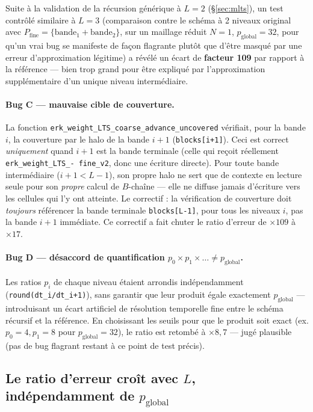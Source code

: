 \documentclass[11pt]{article}
\newcommand{\code}[1]{\texttt{#1}}
\begin{document}
Suite à la validation de la récursion générique à $L=2$ (\S\ref{sec:mlts}),
un test contrôlé similaire à $L=3$ (comparaison contre le schéma à 2
niveaux original avec $P_{\text{fine}}=\{\text{bande}_1+\text{bande}_2\}$,
sur un maillage réduit $N=1$, $p_{\text{global}}=32$, pour qu'un vrai bug
se manifeste de façon flagrante plutôt que d'être masqué par une erreur
d'approximation légitime) a révélé un écart de \textbf{facteur 109} par
rapport à la référence --- bien trop grand pour être expliqué par
l'approximation supplémentaire d'un unique niveau intermédiaire.

\paragraph{Bug C --- mauvaise cible de couverture.} La fonction
\code{erk\_weight\_LTS\_coarse\_advance\_uncovered} vérifiait, pour la
bande $i$, la couverture par le halo de la bande $i{+}1$
(\code{blocks[i+1]}). Ceci est correct \emph{uniquement} quand $i{+}1$ est
la bande terminale (celle qui reçoit réellement \code{erk\_weight\_LTS\_-
fine\_v2}, donc une écriture directe). Pour toute bande intermédiaire
($i+1 < L-1$), son propre halo ne sert que de contexte en lecture seule
pour son \emph{propre} calcul de $B$-chaîne --- elle ne diffuse jamais
d'écriture vers les cellules qui l'y ont atteinte. Le correctif : la
vérification de couverture doit \emph{toujours} référencer la bande
terminale \code{blocks[L-1]}, pour tous les niveaux $i$, pas la bande
$i{+}1$ immédiate. Ce correctif a fait chuter le ratio d'erreur de
$\times 109$ à $\times 17$.

\paragraph{Bug D --- désaccord de quantification $p_0 \times p_1 \times
\dots \ne p_{\text{global}}$.} Les ratios $p_i$ de chaque niveau étaient
arrondis indépendamment (\code{round(dt\_i/dt\_{i+1})}), sans garantir que
leur produit égale exactement $p_{\text{global}}$ --- introduisant un
écart artificiel de résolution temporelle fine entre le schéma récursif et
la référence. En choisissant les seuils pour que le produit soit exact
(ex. $p_0=4, p_1=8$ pour $p_{\text{global}}=32$), le ratio est retombé à
$\times 8{,}7$ --- jugé plausible (pas de bug flagrant restant à ce point
de test précis).

\subsection{Le ratio d'erreur croît avec $L$, indépendamment de $p_{\text{global}}$}
\end{document}
